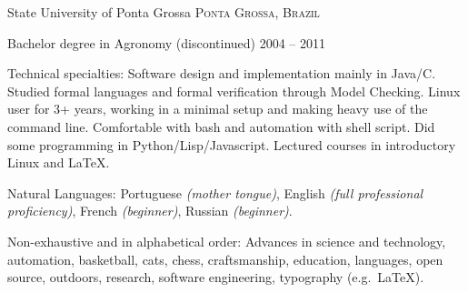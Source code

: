 \documentclass[10pt,a4paper]{article} %
\begin{document}

\headedsection %
{State University of Ponta Grossa}
{\textsc{Ponta Grossa, Brazil}} {

\headedsubsection
{Bachelor degree in Agronomy \textnormal{(discontinued)}}
{2004 -- 2011} {}
}

\spacedhrule{0.5em}{-0.4em} %



\inlineheadsection %
{Technical specialties:}
{Software design and implementation mainly in Java/C. Studied formal languages and formal verification through Model Checking. Linux user for 3+ years, working in a minimal setup and making heavy use of the command line. Comfortable with bash and automation with shell script. Did some programming in Python/Lisp/Javascript. Lectured courses in introductory Linux and LaTeX.}


\inlineheadsection %
{Natural Languages:}
{Portuguese \textit{(mother tongue)}, English \textit{(full professional proficiency)}, French \textit{(beginner)}, Russian \textit{(beginner)}.}


\spacedhrule{1.6em}{-0.4em} %



\inlineheadsection %
{Non-exhaustive and in alphabetical order:}
{Advances in science and technology, automation, basketball, cats, chess, craftsmanship, education, languages, open source, outdoors, research, software engineering, typography (e.g.\ \LaTeX).}
\end{document}
